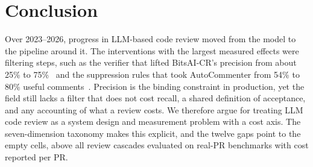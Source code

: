 \section{Conclusion}\label{sec:conclusion}
Over 2023--2026, progress in LLM-based code review moved from the model to the pipeline around it. The interventions with the largest measured effects were filtering steps, such as the verifier that lifted BitsAI-CR's precision from about 25\% to 75\%~\cite{sun2025bitsai} and the suppression rules that took AutoCommenter from 54\% to 80\% useful comments~\cite{vijayvergiya2024ai}. Precision is the binding constraint in production, yet the field still lacks a filter that does not cost recall, a shared definition of acceptance, and any accounting of what a review costs. We therefore argue for treating LLM code review as a system design and measurement problem with a cost axis. The seven-dimension taxonomy makes this explicit, and the twelve gaps point to the empty cells, above all review cascades evaluated on real-PR benchmarks with cost reported per PR.
